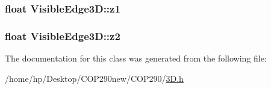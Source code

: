 \subsubsection[{\texorpdfstring{z1}{z1}}]{\setlength{\rightskip}{0pt plus 5cm}float Visible\+Edge3\+D\+::z1}\hypertarget{class_visible_edge3_d_ad080d0b1f9c8327bb691f421b8f04e3f}{}\label{class_visible_edge3_d_ad080d0b1f9c8327bb691f421b8f04e3f}
\subsubsection[{\texorpdfstring{z2}{z2}}]{\setlength{\rightskip}{0pt plus 5cm}float Visible\+Edge3\+D\+::z2}\hypertarget{class_visible_edge3_d_a90b18a97ee484e34b2dc18cadb2366f7}{}\label{class_visible_edge3_d_a90b18a97ee484e34b2dc18cadb2366f7}


The documentation for this class was generated from the following file\+:\begin{DoxyCompactItemize}
\item 
/home/hp/\+Desktop/\+C\+O\+P290new/\+C\+O\+P290/\hyperlink{3_d_8h}{3\+D.\+h}\end{DoxyCompactItemize}
